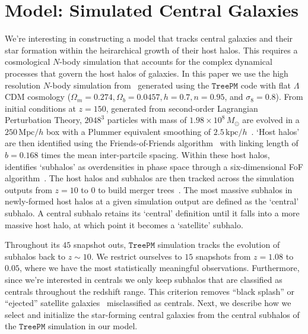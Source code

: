 \documentclass[12pt, letterpaper, preprint, tighten]{aastex62}
\begin{document}
\section{Model: Simulated Central Galaxies} \label{sec:sim}
We're interesting in constructing a model that tracks central galaxies and 
their star formation within the heirarchical growth of their host halos. This 
requires a cosmological $N$-body simulation that accounts for the complex 
dynamical processes that govern the host halos of galaxies. In this paper 
we use the high resolution $N$-body simulation from~\cite{wetzel2013} generated 
using the \cite{white2002} $\mathtt{TreePM}$ code with flat $\Lambda$CDM cosmology 
($\Omega_m =0.274, \Omega_b = 0.0457, h = 0.7, n=0.95$, and $\sigma_8 = 0.8$).
From initial conditions at $z = 150$, generated from second-order Lagrangian 
Perturbation Theory, $2048^3$ particles with mass of $1.98 \times 10^8\,M_\odot$ are 
evolved in a $250\,\mathrm{Mpc}/h$ box with a Plummer equivalent smoothing of 
$2.5\,\mathrm{kpc}/h$~\citep{wetzel2013, wetzel2014}. `Host halos' are then 
identified using the Friends-of-Friends algorithm~\citep[FoF;][]{davis1985} with 
linking length of $b{=}0.168$ times the mean inter-partcile spacing. Within 
these host halos, \cite{wetzel2013} identifies `subhalos' as overdensities 
in phase space through a six-dimensional FoF algorithm~\citep[FoF6D;][]{white2010}. 
The host halos and subhalos are then tracked across the simulation outputs 
from $z = 10$ to $0$ to build merger trees~\citep{wetzel2009,wetzel2010}. 
The most massive subhalos in newly-formed host halos at a given simulation 
output are defined as the `central' subhalo. A central subhalo retains its 
`central' definition until it falls into a more massive host halo, at which 
point it becomes a `satellite' subhalo. 

Throughout its $45$ snapshot outs, $\mathtt{TreePM}$ simulation tracks 
the evolution of subhalos back to $z \sim 10$. We restrict ourselves to $15$ 
snapshots from $z = 1.08$ to $0.05$, where we have the most statistically 
meaningful observations. Furthermore, since we're interested in centrals we only 
keep subhalos that are classified as centrals throughout the redshift 
range. This criterion removes ``black splash'' or ``ejected'' satellite 
galaxies~\citep[\emph{e.g.}][]{mamon2004,wetzel2014} misclassified as 
centrals. Next, we describe how we select and initialize the star-forming 
central galaxies from the central subhalos of the $\mathtt{TreePM}$ 
simulation in our model.
\end{document}

